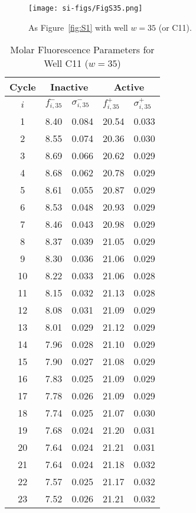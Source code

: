                 \begin{figure}
                    \centering
                    \texttt{[image: si-figs/FigS35.png]}
                    \caption{
                        As Figure~\ref{fig:S1} with well $w=35$ (or C11).
                    }
                \end{figure}
                \clearpage
    \begin{table}
        \caption{Molar Fluorescence Parameters for Well C11 ($w=35$)}
        \centering
        \begin{tabular}{c|ll|ll}
            Cycle & \multicolumn{2}{c|}{Inactive} & \multicolumn{2}{c}{Active} \\
            \hline
            $i$ & $f_{i,35}^{-}$ & $\sigma_{i,35}^{-}$ &  $f_{i,35}^{+}$ & $\sigma_{i,35}^{+}$ \\
            \hline
    1 & 8.40 & 0.084 & 20.54 & 0.033 \\
2 & 8.55 & 0.074 & 20.36 & 0.030 \\
3 & 8.69 & 0.066 & 20.62 & 0.029 \\
4 & 8.68 & 0.062 & 20.78 & 0.029 \\
5 & 8.61 & 0.055 & 20.87 & 0.029 \\
6 & 8.53 & 0.048 & 20.93 & 0.029 \\
7 & 8.46 & 0.043 & 20.98 & 0.029 \\
8 & 8.37 & 0.039 & 21.05 & 0.029 \\
9 & 8.30 & 0.036 & 21.06 & 0.029 \\
10 & 8.22 & 0.033 & 21.06 & 0.028 \\
11 & 8.15 & 0.032 & 21.13 & 0.028 \\
12 & 8.08 & 0.031 & 21.09 & 0.029 \\
13 & 8.01 & 0.029 & 21.12 & 0.029 \\
14 & 7.96 & 0.028 & 21.10 & 0.029 \\
15 & 7.90 & 0.027 & 21.08 & 0.029 \\
16 & 7.83 & 0.025 & 21.09 & 0.029 \\
17 & 7.78 & 0.026 & 21.09 & 0.029 \\
18 & 7.74 & 0.025 & 21.07 & 0.030 \\
19 & 7.68 & 0.024 & 21.20 & 0.031 \\
20 & 7.64 & 0.024 & 21.21 & 0.031 \\
21 & 7.64 & 0.024 & 21.18 & 0.032 \\
22 & 7.57 & 0.025 & 21.17 & 0.032 \\
23 & 7.52 & 0.026 & 21.21 & 0.032 \\

\end{tabular}
\end{table}
